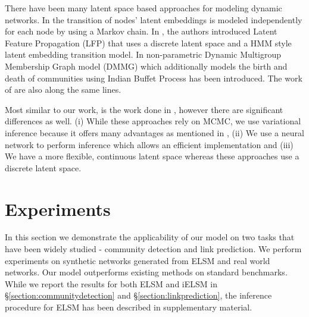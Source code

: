\documentclass[letterpaper]{article} %
\begin{document}
There have been many latent space based approaches for modeling dynamic networks. In \cite{SwellEtAl:2015:LatentSpaceModelsForDynamicNetworks,SwellEtAl:2016:LatentSpaceModelsForDynamicNetworksWithWeightedEdges} the transition of nodes' latent embeddings is modeled independently for each node by using a Markov chain. In \cite{HeaukulaniEtAl:2013:DynamicProbabilisticModelsForLatentFeaturePropagationInSocialNetworks}, the authors introduced Latent Feature Propagation (LFP) that uses a discrete latent space and a HMM style latent embedding transition model. In \cite{KimEtAl:2013:NonparametricMultiGroupMembershipModelForDynamicNetworks} non-parametric Dynamic Multigroup Membership Graph model (DMMG) which additionally models the birth and death of communities using Indian Buffet Process \cite{Griffiths:2011:TheIndianBuffetProcessAnIntroductionAndReview} has been introduced. The work of \cite{MillerEtAl:2009:NonparametricLatentFeatureModelsForLinkPrediction,FouldsEtAl:2011:ADynamicRelationalInfiniteFeatureModelForLongitudinalSocialNetworks} are also along the same lines.

Most similar to our work, is the work done in \cite{HeaukulaniEtAl:2013:DynamicProbabilisticModelsForLatentFeaturePropagationInSocialNetworks,KimEtAl:2013:NonparametricMultiGroupMembershipModelForDynamicNetworks}, however there are significant differences as well. (i) While these approaches rely on MCMC, we use variational inference because it offers many advantages as mentioned in \cite{BleiEtAl:2017:VariationalInferenceAReviewForStatisticians}, (ii) We use a neural network to perform inference which allows an efficient implementation and (iii) We have a more flexible, continuous latent space whereas these approaches use a discrete latent space.



\section{Experiments}
\label{section:experiments}
In this section we demonstrate the applicability of our model on two tasks that have been widely studied - community detection and link prediction. We perform experiments on synthetic networks generated from ELSM and real world networks. Our model outperforms existing methods on standard benchmarks. While we report the results for both ELSM and iELSM in \S \ref{section:communitydetection} and \S \ref{section:linkprediction}, the inference procedure for ELSM has been described in supplementary material.
\end{document}
